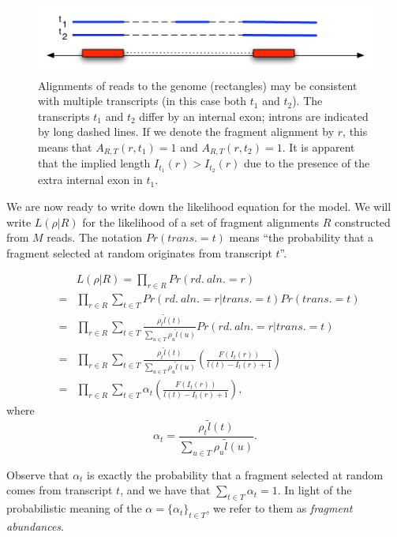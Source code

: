\documentclass[12pt]{amsart}
\theoremstyle{definition}
\begin{document}
\begin{figure}[!ht] 
    \includegraphics[scale=0.8]{pdfs/implied_length}
    \caption[Implied length of a fragment alignment]{Alignments of reads to the genome (rectangles) may be consistent with multiple transcripts (in this case both $t_1$ and $t_2$). The transcripts $t_1$ and $t_2$ differ by an internal exon; introns are indicated by long dashed lines. If we denote the fragment alignment by $r$, this means that $A_{R,T}(r,t_1)=1$ and $A_{R,T}(r,t_2)=1$. It is apparent that the implied length $I_{t_1}(r) > I_{t_2}(r)$ due to the presence of the extra internal exon in $t_1$. }
\end{figure}

We are now ready to write down the likelihood equation for the model. We will
write $L(\rho|R)$ for the likelihood of a set of fragment alignments $R$
constructed from $M$ reads. The notation $Pr(trans. = t)$ means ``the
probability that a fragment selected at random originates from transcript $t$''.

\begin{eqnarray}
& & L(\rho|R) = \prod_{r \in R} Pr(rd.\ aln. =r)\\
&  = & \prod_{r \in R} \sum_{t \in T} Pr(rd.\ aln. =r|trans. =t)Pr(trans. =t)\\
& = & \prod_{r \in R} \sum_{t \in T} \frac{\rho_t\tilde{l}(t)}{\sum_{u \in T}\rho_u\tilde{l}(u)} Pr(rd.\ aln. = r|trans. =t)\\ 
& = & \prod_{r \in R} \sum_{t \in T}\frac{\rho_t\tilde{l}(t)}{\sum_{u \in T}\rho_u\tilde{l}(u)} \left(\frac{F(I_t(r))}{l(t)-I_t(r)+1}\right) \\ \label{eq:likerho}
& = &  \prod_{r \in R} \sum_{t \in T} \alpha_t\left(\frac{F(I_t(r))}{l(t)-I_t(r)+1}\right),
\end{eqnarray}
where 
\begin{equation}
\alpha_t = \frac{\rho_t\tilde{l}(t)}{\sum_{u \in T}\rho_u\tilde{l}(u)}.
\end{equation}

Observe that $\alpha_t$ is exactly the probability that a fragment selected at
random comes from transcript $t$, and we have that $\sum_{t \in T}\alpha_t =
1$. In light of the probabilistic meaning of the $\alpha=\{\alpha_t\}_{t \in T}$, we refer to them as
{\em fragment abundances}.
\end{document}
